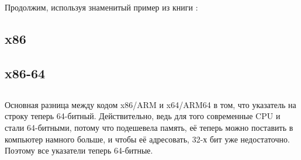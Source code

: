 \section{\HelloWorldSectionName}
\label{sec:helloworld}

Продолжим, используя знаменитый пример из книги \KRBook:



\subsection{x86}




\subsection{x86-64}







\subsection{\Conclusion{}}

Основная разница между кодом x86/ARM и x64/ARM64 в том, что указатель на строку теперь 64-битный.
Действительно, ведь для того современные \ac{CPU} и стали 64-битными, потому что подешевела память,
её теперь можно поставить в компьютер намного больше, и чтобы её адресовать, 32-х бит уже
недостаточно.
Поэтому все указатели теперь 64-битные.



